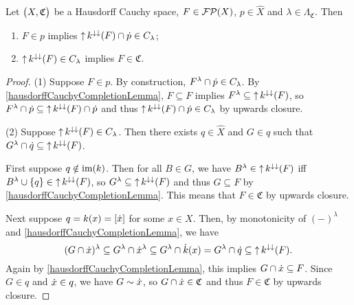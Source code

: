 \begin{lemma} \label{mappingFiltersLemmaCauchyCompletion}
Let $\sSet[\big]{X, \mathfrak{C}}$ be a Hausdorff Cauchy space, $F \in \operatorname{\mathcal{FP}}(X)$, $p\in \hat{X}$ and $\lambda \in \Lambda_\mathfrak{C}$. Then
\begin{enumerate}
\item $F\in p$ implies $\operatorname{\uparrow} k^{\downarrow\downarrow}(F) \cap \dot{p} \in C_\lambda$;
\item $\operatorname{\uparrow} k^{\downarrow\downarrow}(F) \in C_\lambda$ implies $F\in\mathfrak{C}$.
\end{enumerate}
\end{lemma}
\begin{proof}
(1) Suppose $F\in p$. By construction, $F^\lambda\cap\dot{p}\in C_\lambda$. By \ref{hausdorffCauchyCompletionLemma}, $F\subseteq F$ implies $F^\lambda \subseteq \operatorname{\uparrow} k^{\downarrow\downarrow}(F)$, so $F^\lambda\cap\dot{p} \subseteq \operatorname{\uparrow} k^{\downarrow\downarrow}(F)\cap \dot{p}$ and thus $\operatorname{\uparrow} k^{\downarrow\downarrow}(F)\cap\dot{p} \in C_\lambda$ by upwards closure.

(2) Suppose $\operatorname{\uparrow} k^{\downarrow\downarrow}(F)\in C_\lambda$. Then there exists $q\in \hat{X}$ and $G\in q$ such that $G^\lambda \cap \dot{q} \subseteq \operatorname{\uparrow} k^{\downarrow\downarrow}(F)$.

First suppose $q\notin \operatorname{im}(k)$. Then for all $B \in G$, we have $B^\lambda \in \operatorname{\uparrow} k^{\downarrow\downarrow}(F)$ iff $B^\lambda \cup \{q\}\in \operatorname{\uparrow} k^{\downarrow\downarrow}(F)$, so $G^\lambda \subseteq \operatorname{\uparrow} k^{\downarrow\downarrow}(F)$ and thus $G\subseteq F$ by \ref{hausdorffCauchyCompletionLemma}. This means that $F\in \mathfrak{C}$ by upwards closure.

Next suppose $q = k(x) = [\dot{x}]$ for some $x\in X$. Then, by monotonicity of $(-)^\lambda$ and \ref{hausdorffCauchyCompletionLemma}, we have
\[ (G\cap \dot{x})^\lambda \subseteq G^\lambda \cap \dot{x}^\lambda \subseteq G^\lambda \cap \dot{k}(x) = G^\lambda \cap \dot{q} \subseteq \operatorname{\uparrow} k^{\downarrow\downarrow}(F). \]
Again by \ref{hausdorffCauchyCompletionLemma}, this implies $G\cap \dot{x} \subseteq F$. Since $G\in q$ and $\dot{x}\in q$, we have $G\sim \dot{x}$, so $G\cap \dot{x}\in \mathfrak{C}$ and thus $F\in \mathfrak{C}$ by upwards closure.
\end{proof}

